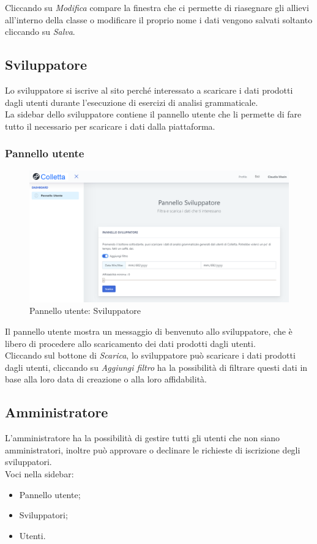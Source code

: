         	
Cliccando su \textit{Modifica} compare la finestra che ci permette di riasegnare gli allievi all'interno della classe o modificare il proprio nome i dati vengono salvati soltanto cliccando su \textit{Salva}.
        
	\newpage
    \subsection{Sviluppatore}
    Lo sviluppatore si iscrive al sito perché interessato a scaricare i dati prodotti dagli utenti durante l'esecuzione di esercizi di analisi grammaticale.
    	 \\La sidebar dello sviluppatore contiene il pannello utente che li permette di fare tutto il necessario per scaricare i dati dalla piattaforma.
   
    	\subsubsection{Pannello utente}
    				\begin{figure}[H]
				\centering
				\includegraphics[width=17cm]{sez/img/sviluppatore/panelloutente.PNG}
				\caption{Pannello utente: Sviluppatore}\label{fig:1}
			\end{figure}
    	  Il pannello utente mostra un messaggio di benvenuto allo sviluppatore, che è libero di procedere allo scaricamento dei dati prodotti dagli utenti.
    	   \\Cliccando sul bottone di \textit{Scarica}, lo sviluppatore può scaricare i dati prodotti dagli utenti, cliccando su \textit{Aggiungi filtro} ha la possibilità di filtrare questi dati in base alla loro data di creazione o alla loro affidabilità. 

	\newpage
	\subsection{Amministratore}
	L'amministratore ha la possibilità di gestire tutti gli utenti che non siano amministratori, inoltre può approvare o declinare le richieste di iscrizione degli sviluppatori.
		  \\Voci nella sidebar:
			\begin{itemize}
				\item Pannello utente;
				\item Sviluppatori;
				\item Utenti.
			\end{itemize}



